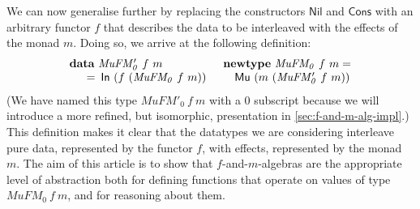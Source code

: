\documentclass{jfp1}
\newcommand{\kw}[1]{\textbf{#1}}
\begin{document}
We can now generalise further by replacing the constructors
$\mathsf{Nil}$ and $\mathsf{Cons}$ with an arbitrary functor $f$ that
describes the data to be interleaved with the effects of the monad
$m$. Doing so, we arrive at the following definition:
\begin{displaymath}
  \begin{array}{ll}
    \kw{data}~\mathit{MuFM_0'}~f~m
    &
    \kw{newtype}~\mathit{MuFM_0}~f~m =
    \\
    \quad
    \begin{array}[t]{c@{\hspace{0.5em}}l}
      = & \mathsf{In}~(f~(\mathit{MuFM_0}~f~m))
    \end{array}
    &
    \quad \mathsf{Mu}~(m~(\mathit{MuFM_0'}~f~m))
  \end{array}
\end{displaymath}
(We have named this type $\mathit{MuFM'_0}~f~m$ with a $0$ subscript
because we will introduce a more refined, but isomorphic, presentation
in \autoref{sec:f-and-m-alg-impl}.)  This definition makes it clear
that the datatypes we are considering interleave pure data,
represented by the functor $f$, with effects, represented by the monad
$m$. The aim of this article is to show that $f$-and-$m$-algebras are
the appropriate level of abstraction both for defining functions that
operate on values of type $\mathit{MuFM_0}~f~m$, and for reasoning
about them.


\end{document}
